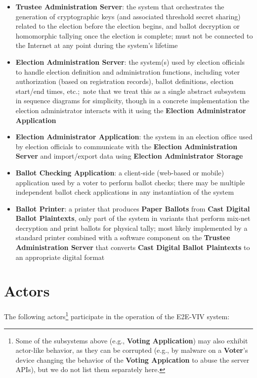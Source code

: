 \documentclass[10pt,letterpaper]{article}
\begin{document}
\begin{itemize}
    \item \textbf{Trustee Administration Server}: the system that orchestrates the generation of cryptographic keys (and associated threshold secret sharing) related to the election before the election begins, and ballot decryption or homomorphic tallying once the election is complete; must not be connected to the Internet at any point during the system's lifetime

    \item \textbf{Election Administration Server}: the system(s) used by election officials to handle election definition and administration functions, including voter authorization (based on registration records), ballot definitions, election start/end times, etc.;~note that we treat this as a single abstract subsystem in sequence diagrams for simplicity, though in a concrete implementation the election administrator interacts with it using the \textbf{Election Administrator Application}

    \item \textbf{Election Administrator Application}: the system in an election office used by election officials to communicate with the \textbf{Election Administration Server} and import/export data using \textbf{Election Administrator Storage}

    \item \textbf{Ballot Checking Application}: a client-side (web-based or mobile) application used by a voter to perform ballot checks; there may be multiple independent ballot check applications in any instantiation of the system

    \item \textbf{Ballot Printer}: a printer that produces \textbf{Paper Ballots} from \textbf{Cast Digital Ballot Plaintexts}, only part of the system in variants that perform mix-net decryption and print ballots for physical tally; most likely implemented by a standard printer combined with a software component on the \textbf{Trustee Administration Server} that converts \textbf{Cast Digital Ballot Plaintexts} to an appropriate digital format

\end{itemize}

\pagebreak
\section{Actors}

The following actors\footnote{Some of the subsystems above (e.g., \textbf{Voting Application}) may also exhibit actor-like behavior, as they can be corrupted (e.g., by malware on a \textbf{Voter}'s device changing the behavior of the \textbf{Voting Appication} to abuse the server APIs), but we do not list them separately here.} participate in the operation of the E2E-VIV system:
\end{document}
